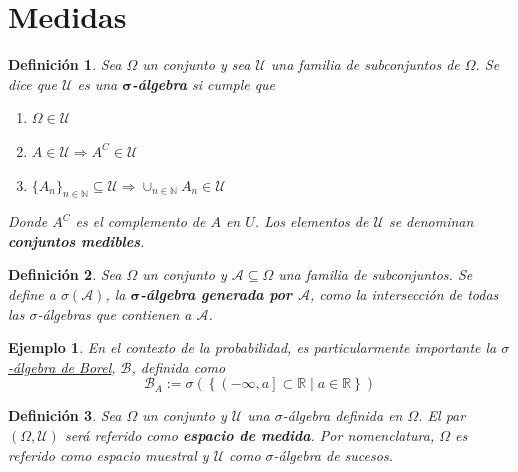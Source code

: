 \documentclass[12pt,letterpaper]{book}
\newtheorem{definicion}{Definición}[chapter]
\newtheorem{ejemplo}{Ejemplo}[chapter]
\newcommand{\R}{\mathbb{R}}
\newcommand{\talque}{\mathrel{}\middle|\mathrel{}}
\begin{document}

\section{Medidas}

\begin{definicion}%
Sea $\Omega$ un conjunto y sea $\mathcal{U}$ una familia de subconjuntos de $\Omega$. Se dice que $\mathcal{U}$ es una \textbf{$\boldsymbol{\sigma}$-álgebra} si cumple que
\begin{enumerate}[label=\MakeLowercase{\roman{*}})]
\item $\Omega \in \mathcal{U}$
\item $A \in \mathcal{U} \Rightarrow A^{C} \in \mathcal{U}$
\item $ \displaystyle \{ A_n \}_{n\in \mathbb{N}} \subseteq \mathcal{U} 
\Rightarrow \cup_{n\in \mathbb{N}} A_n \in \mathcal{U}$
\end{enumerate}
Donde $A^{C}$ es el complemento de $A$ en $U$. Los elementos de $\mathcal{U}$ se denominan \textbf{conjuntos medibles}. 
\end{definicion}

\begin{definicion}
Sea $\Omega$ un conjunto y $\mathcal{A} \subseteq \Omega$ una familia de subconjuntos. Se define a $\sigma(\mathcal{A})$, la \textbf{$\boldsymbol{\sigma}$-álgebra generada por $\boldsymbol{\mathcal{A}}$}, como la intersección de todas las $\sigma$-álgebras que contienen a $\mathcal{A}$.
\end{definicion}

\begin{ejemplo}
En el contexto de la probabilidad, es particularmente importante la \underline{$\sigma$-álgebra de Borel}, $\mathcal{B}$, definida como
\begin{equation}
\mathcal{B}_A := \sigma\left( \left\{ \left( -\infty , a \right] \subset \R \talque a\in \R \right\} \right)
\end{equation}
\end{ejemplo}

\begin{definicion}
Sea $\Omega$ un conjunto y $\mathcal{U}$ una $\sigma$-álgebra definida en $\Omega$. El par $(\Omega,\mathcal{U})$ será referido como \textbf{espacio de medida}. Por nomenclatura, $\Omega$ es referido como \textit{espacio muestral} y $\mathcal{U}$ como \textit{$\sigma$-álgebra de sucesos}.
\end{definicion}
\end{document}
